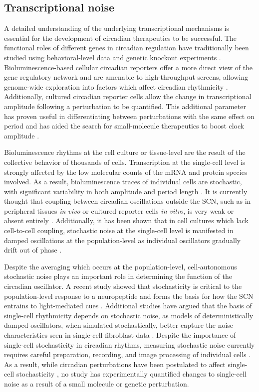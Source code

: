 \subsection{Transcriptional noise}
A detailed understanding of the underlying transcriptional mechanisms is essential for the development of circadian therapeutics to be successful. 
The functional roles of different genes in circadian regulation have traditionally been studied using behavioral-level data and genetic knockout experiments \cite{Vitaterna1994}.
Bioluminescence-based cellular circadian reporters offer a more direct view of the gene regulatory network \cite{Balsalobre1998} and are amenable to high-throughput screens, allowing genome-wide exploration into factors which affect circadian rhythmicity \cite{Zhang2009}.
Additionally, cultured circadian reporter cells allow the change in transcriptional amplitude following a perturbation to be quantified.
This additional parameter has proven useful in differentiating between perturbations with the same effect on period \cite{St.John2014} and has aided the search for small-molecule therapeutics to boost clock amplitude \cite{Chen2013}.

Bioluminescence rhythms at the cell culture or tissue-level are the result of the collective behavior of thousands of cells.
Transcription at the single-cell level is strongly affected by the low molecular counts of the mRNA and protein species involved. 
As a result, bioluminescence traces of individual cells are stochastic, with significant variability in both amplitude and period length \cite{Welsh2004}. 
It is currently thought that coupling between circadian oscillations outside the SCN, such as in peripheral tissues {\itshape in vivo} or cultured reporter cells {\itshape in vitro}, is very weak or absent entirely \cite{Guenthner2014, Noguchi2013}.
Additionally, it has been shown that in cell cultures which lack cell-to-cell coupling, stochastic noise at the single-cell level is manifested in damped oscillations at the population-level as individual oscillators gradually drift out of phase \cite{Nagoshi2004, Welsh2004}. 

Despite the averaging which occurs at the population-level, cell-autonomous stochastic noise plays an important role in determining the function of the circadian oscillator.
A recent study showed that stochasticity is critical to the population-level response to a neuropeptide and forms the basis for how the SCN entrains to light-mediated cues \cite{An2013}.
Additional studies have argued that the basis of single-cell rhythmicity depends on stochastic noise, as models of deterministically damped oscillators, when simulated stochastically, better capture the noise characteristics seen in single-cell fibroblast data \cite{Westermark2009}.
Despite the importance of single-cell stochasticity in circadian rhythms, measuring stochastic noise currently requires careful preparation, recording, and image processing of individual cells \cite{Leise2012}. 
As a result, while circadian perturbations have been postulated to affect single-cell stochasticity \cite{Rougemont2007}, no study has experimentally quantified changes to single-cell noise as a result of a small molecule or genetic perturbation.

